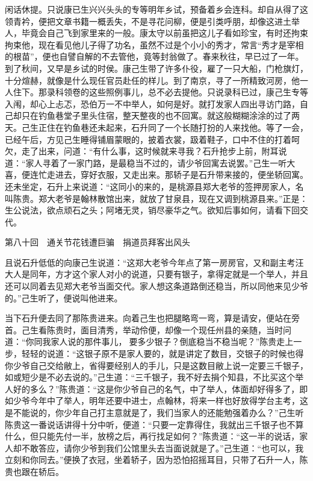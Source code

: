 \documentclass[12pt,UTF8]{ctexbook}
\begin{document}
{{{闲话休提。只说康已生兴兴头头的专等明年乡试，预备着乡会连科。却自从得了这领青衿，便把文章书籍一概丢失，不是寻花问柳，便是引类呼朋，却像这进土举人，毕竟会自己飞到家里来的一般。康太守以前虽把这儿子看如珍宝，有时还拘束拘束他，现在看见他儿子得了功名，虽然不过是个小小的秀才，常言“秀才是宰相的根苗”，便也自譬自解的不去管他，竟等封翁做了。春来秋往，早已过了一年。到了秋间，又早是乡试的时侯。康己生带了许多仆役，雇了一只大船，门枪旗灯，十分煊赫，就像是什么现任官员赴任的样儿。到了南京，寻了一所精致河房，他一人住下。那录科领卷的这些照例事儿，总不必去提他。只说录科已过，康己生专等入闱，却心上忐忑，恐伯万一不中举人，如何是好。就打发家人四出寻访门路，自己却只在钓鱼巷堂子里头住宿，整天整夜的也不回寓。就这般糊糊涂涂的过了两天。己生正住在钓鱼巷还未起来，石升同了一个长随打扮的人来找他。等了一会，已经午后，方见己生睡得铺眉蒙眼的，披着衣裳，趿着鞋子，口中不住的打着呵欠，走了出来，问道：“有什么事，这时候就来寻我？石升抢步上前，附耳说道：“家人寻着了一家门路，是最稳当不过的，请少爷回寓去说罢。”己生一听大喜，便连忙走进去，穿好衣服，又走出来。那轿子是石升带来接的，便坐轿回寓。还未坐定，石升上来说道：“这同小的来的，是桃源县郑大老爷的签押房家人，名叫陈贵。郑大老爷是翰林散馆出来，就放了甘泉县，现在又调到桃源县来。”正是：生公说法，欲点顽石之头；阿堵无灵，销尽豪华之气。欲知后事如何，请看下回交代。





第八十回　通关节花钱遭巨骗　捐道员拜客出风头





且说石升低低的向康己生说道：“这郑大老爷今年点了第一房房官，又和副主考汪大人是同年，方才这个家人对小的说道，只要有银子，拿得定就是一个举人，并且还可以同着去见郑大老爷当面交代。家人想这条道路倒还稳当，所以同他来见少爷的。”己生听了，便说叫他进来。

当下石升便去同了那陈贵进来。向着己生也把腿略弯一弯，算是请安，便站在旁首。己生看陈贵时，面目清秀，举动伶便，却像一个现任州县的亲随，当时问道：“你同我家人说的那件事儿，要多少银子？倒底稳当不稳当呢？”陈贵走上一步，轻轻的说道：“这银子原不是家人要的，就是讲定了数目，交银子的时候也得你少爷自己交给敝上，省得要经别人的手儿，只是这数目敝上说一定要三千银子，如或短少是不必去说的。”己生道：“三千银子，我不好去捐个知县，不比买这个举人好的多么？”陈贵道：“这是你少爷自己的名气，中了举人，体面却好得多了，即如少爷今年中了举人，明年还要中进士，点翰林，将来一样也好放得学台主考，这是不能说的，你少年自己打主意就是了，我们当家人的还能勉强着办么？”己生听陈贵这一番说话讲得十分中听，便道：“只要一定靠得住，我就出三千银子也不算什么，但只能先付一半，放榜之后，再行找足如何？”陈贵道：“这一半的说话，家人却不敢答应，请你少爷到我们公馆里头去当面说就是了。”己生道：“也可以，我立刻和你同去。”便换了衣冠，坐着轿子，因为恐怕招摇耳目，只带了石升一人，陈贵也跟在轿后。

}}}
\end{document}

